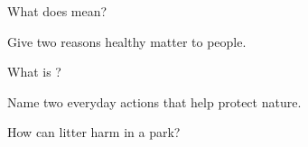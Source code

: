\begin{exercise}[$\star$]\label{exo:g4:protecting:1}
What does  mean?
\end{exercise}

\begin{exercise}[$\star$]\label{exo:g4:protecting:2}
Give two reasons healthy  matter to people.
\end{exercise}

\begin{exercise}[$\star$]\label{exo:g4:protecting:3}
What is ?
\end{exercise}

\begin{exercise}[$\star$]\label{exo:g4:protecting:4}
Name two everyday actions that help protect nature.
\end{exercise}

\begin{exercise}[$\star\star$]\label{exo:g4:protecting:5}
How can litter harm  in a park?
\end{exercise}

